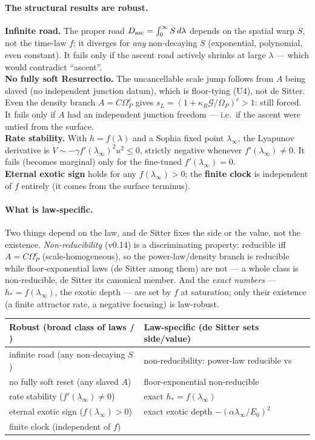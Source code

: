 \documentclass[11pt,a4paper]{article}
\theoremstyle{plain}
\theoremstyle{definition}
\theoremstyle{remark}
\begin{document}
\paragraph{The structural results are robust.}
\textbf{Infinite road.} The proper road $D_{\rm asc}=\int_0^\infty S\,d\lambda$ depends on the spatial
warp $S$, not the time-law $f$; it diverges for \emph{any} non-decaying $S$ (exponential, polynomial,
even constant). It fails only if the ascent road actively shrinks at large $\lambda$ --- which would
contradict ``ascent''.\\
\textbf{No fully soft Resurrectio.} The uncancellable scale jump follows from $A$ being slaved (no
independent junction datum), which is floor-tying (U4), not de Sitter. Even the density branch
$A=C\Omega_P^c$ gives $s_L=(1+\kappa_R\mathcal G/\Omega_P)^c>1$: still forced. It fails only if $A$ had
an independent junction freedom --- i.e.\ if the ascent were untied from the surface.\\
\textbf{Rate stability.} With $h=f(\lambda)$ and a Sophia fixed point $\lambda_\infty$, the Lyapunov
derivative is $\dot V\sim-\gamma f'(\lambda_\infty)^2u^2\le0$, strictly negative whenever
$f'(\lambda_\infty)\neq0$. It fails (becomes marginal) only for the fine-tuned $f'(\lambda_\infty)=0$.\\
\textbf{Eternal exotic sign} holds for any $f(\lambda_\infty)>0$; the \textbf{finite clock} is
independent of $f$ entirely (it comes from the surface terminus).

\paragraph{What is law-specific.} Two things depend on the law, and de Sitter fixes the side or the
value, not the existence. \emph{Non-reducibility} (v0.14) is a discriminating property: reducible iff
$A=C\Omega_P^c$ (scale-homogeneous), so the power-law/density branch is reducible while floor-exponential
laws (de Sitter among them) are not --- a whole class is non-reducible, de Sitter its canonical member.
And the \emph{exact numbers} --- $h_*=f(\lambda_\infty)$, the exotic depth --- are set by $f$ at
saturation; only their existence (a finite attractor rate, a negative focusing) is law-robust.

\begin{center}
\renewcommand{\arraystretch}{1.3}
\begin{tabular}{ll}
\hline
\textbf{Robust (broad class of laws $f$)} & \textbf{Law-specific (de Sitter sets side/value)}\\
\hline
infinite road (any non-decaying $S$) & non-reducibility: power-law reducible vs\\
no fully soft reset (any slaved $A$) & \quad floor-exponential non-reducible\\
rate stability ($f'(\lambda_\infty)\neq0$) & exact $h_*=f(\lambda_\infty)$\\
eternal exotic sign ($f(\lambda_\infty)>0$) & exact exotic depth $-(\alpha\lambda_\infty/E_0)^2$\\
finite clock (independent of $f$) & \\
\hline
\end{tabular}
\end{center}
\end{document}

